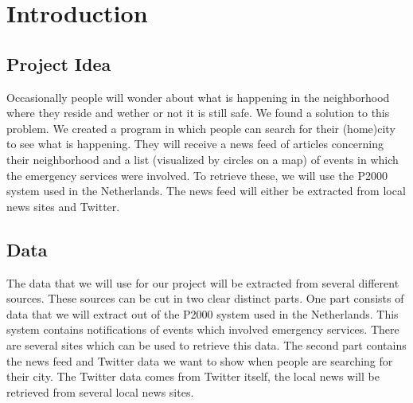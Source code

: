 \section{Introduction}
\subsection{Project Idea}
Occasionally people will wonder about what is happening in the neighborhood where they reside and wether or not it is still safe.
We found a solution to this problem. 
We created a program in which people can search for their (home)city to see what is happening. 
They will receive a news feed of articles concerning their neighborhood and a list (visualized by circles on a map) of events in which the emergency services were involved. 
To retrieve these, we will use the P2000 system used in the Netherlands. The news feed will either be extracted from local news sites and Twitter.

\subsection{Data}
The data that we will use for our project will be extracted from several different sources. 
These sources can be cut in two clear distinct parts. 
One part consists of data that we will extract out of the P2000 system used in the Netherlands. 
This system contains notifications of events which involved emergency services. 
There are several sites which can be used to retrieve this data.
The second part contains the news feed and Twitter data we want to show when people are searching for their city. 
The Twitter data comes from Twitter itself, the local news will be retrieved from several local news sites. 

